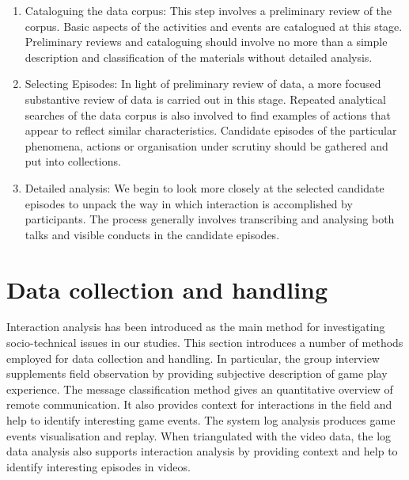 \begin{enumerate}

\item Cataloguing the data corpus: This step involves a preliminary review of the corpus. Basic aspects of the activities and events are catalogued at this stage. Preliminary reviews and cataloguing should involve no more than a simple description and classification of the materials without detailed analysis. \\

\item Selecting Episodes: In light of preliminary review of data, a more focused substantive review of data is carried out in this stage. Repeated analytical searches of the data corpus is also involved to find examples of actions that appear to reflect similar characteristics. Candidate episodes of the particular phenomena, actions or organisation under scrutiny should be gathered and put into collections. \\

\item Detailed analysis:  We begin to look more closely at the selected candidate episodes to unpack the way in which interaction is accomplished by participants. The process generally involves transcribing and analysing both talks and visible conducts in the candidate episodes. \\ 

\end{enumerate}




\section{Data collection and handling}\label{sec:methdatahandling}
Interaction analysis has been introduced as the main method for investigating socio-technical issues in our studies. This section introduces a number of methods employed for data collection and handling. In particular, the group interview supplements field observation by providing subjective description of game play experience. The message classification method gives an quantitative overview of remote communication. It also provides context for interactions in the field and help to identify interesting game events. The system log analysis produces game events visualisation and replay. When triangulated with the video data, the log data analysis also supports interaction analysis by providing context and help to identify interesting episodes in videos.\\


